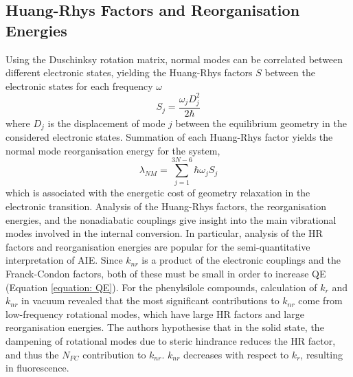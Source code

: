 \subsection{Huang-Rhys Factors and Reorganisation Energies}\label{section: lom HR}
Using the Duschinksy rotation matrix, normal modes can be correlated between different electronic states, yielding the Huang-Rhys factors $S$ between the electronic states for each frequency $\omega$
\begin{equation}
S_{j}=\frac{\omega_{j}D_{j}^2}{2\hbar{}}
\end{equation}
where $D_{j}$ is the displacement of mode $j$ between the equilibrium geometry in the considered electronic states. Summation of each Huang-Rhys factor yields the normal mode reorganisation energy for the system,
\begin{equation}
\lambda_{NM}=\sum_{j=1}^{3N-6}\hbar{}\omega_{j}S_{j}
\end{equation}
which is associated with the energetic cost of geometry relaxation in the electronic transition. Analysis of the Huang-Rhys factors, the reorganisation energies, and the nonadiabatic couplings give insight into the main vibrational modes involved in the internal conversion. In particular, analysis of the HR factors and reorganisation energies are popular for the semi-quantitative interpretation of AIE.\cite{Yin2006,Peng2007,Li2011,Peng2013,Shuai2014c,Shuai2014,Wu2014,Zhang2015a,Zheng2016,Fan2016,Zhang2016,Duan2017,Fan2017,Fan2018} Since $k_{nr}$ is a product of the electronic couplings and the Franck-Condon factors, both of these must be small in order to increase \ac{QE} (Equation \ref{equation: QE}). For the phenylsilole compounds, calculation of $k_{r}$ and $k_{nr}$ in vacuum revealed that the most significant contributions to $k_{nr}$ come from low-frequency rotational modes, which have large \ac{HR} factors and large reorganisation energies. The authors hypothesise that in the solid state, the dampening of rotational modes due to steric hindrance reduces the \ac{HR} factor, and thus the $N_{FC}$ contribution to $k_{nr}$.\cite{Yui2005,Yin2006} $k_{nr}$ decreases with respect to $k_{r}$, resulting in fluorescence.

